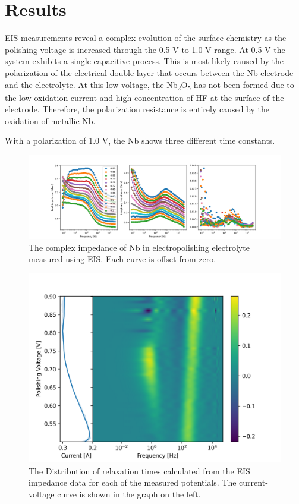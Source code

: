 \documentclass[11pt]{article}
\begin{document}
\section{Results}
\label{sec:org4a45003}

EIS measurements reveal a complex evolution of the surface chemistry as the polishing voltage is increased through the 0.5 V to 1.0 V range. At 0.5 V the system exhibits a single capacitive process. This is most likely caused by the polarization of the electrical double-layer that occurs between the Nb electrode and the electrolyte. At this low voltage, the Nb\textsubscript{2}O\textsubscript{5} has not been formed due to the low oxidation current and high concentration of HF at the surface of the electrode. Therefore, the polarization resistance is entirely caused by the oxidation of metallic Nb.

With a polarization of 1.0 V, the Nb shows three different time constants.

\begin{figure}
  \label{fig:bodeplot}
  \includegraphics[]{figures/bodeplot.png}
  \caption{The complex impedance of Nb in electropolishing electrolyte measured using EIS. Each curve is offset from zero.}
\end{figure}

\begin{figure}
  \label{fig:gamma}
  \includegraphics[]{figures/gamma.png}  
  \caption{The Distribution of relaxation times calculated from the EIS impedance data for each of the measured potentials. The current-voltage curve is shown in the graph on the left.}
\end{figure}
\end{document}
